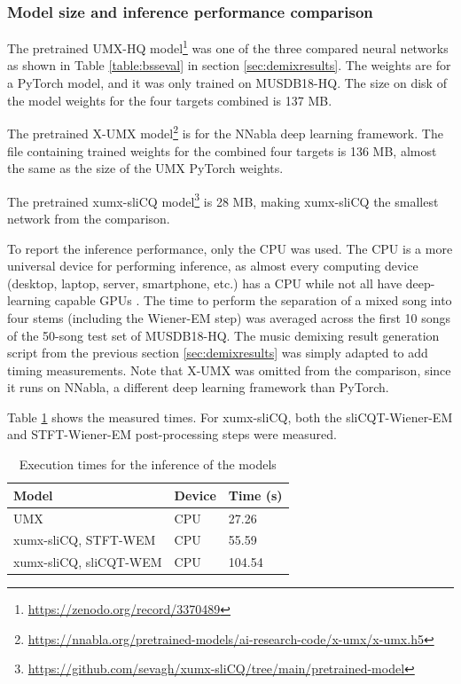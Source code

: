 \documentclass[report.tex]{subfiles}
\begin{document}
\newpagefill

\subsubsection{Model size and inference performance comparison}
\label{sec:inferenceperf}

The pretrained UMX-HQ model\footnote{\url{https://zenodo.org/record/3370489}} was one of the three compared neural networks as shown in Table \ref{table:bsseval} in section \ref{sec:demixresults}. The weights are for a PyTorch model, and it was only trained on MUSDB18-HQ. The size on disk of the model weights for the four targets combined is 137 MB.

The pretrained X-UMX model\footnote{\url{https://nnabla.org/pretrained-models/ai-research-code/x-umx/x-umx.h5}} is for the NNabla deep learning framework. The file containing trained weights for the combined four targets is 136 MB, almost the same as the size of the UMX PyTorch weights.

The pretrained xumx-sliCQ model\footnote{\url{https://github.com/sevagh/xumx-sliCQ/tree/main/pretrained-model}} is 28 MB, making xumx-sliCQ the smallest network from the comparison.

To report the inference performance, only the CPU was used. The CPU is a more universal device for performing inference, as almost every computing device (desktop, laptop, server, smartphone, etc.) has a CPU while not all have deep-learning capable GPUs \parencite{deepcpuinf, deepcpuinf2}. The time to perform the separation of a mixed song into four stems (including the Wiener-EM step) was averaged across the first 10 songs of the 50-song test set of MUSDB18-HQ. The music demixing result generation script from the previous section \ref{sec:demixresults} was simply adapted to add timing measurements. Note that X-UMX was omitted from the comparison, since it runs on NNabla, a different deep learning framework than PyTorch.

Table \ref{table:infperf} shows the measured times. For xumx-sliCQ, both the sliCQT-Wiener-EM and STFT-Wiener-EM post-processing steps were measured.

\begin{table}[ht]
	\centering
	\caption{Execution times for the inference of the models}
	\label{table:infperf}
	\begin{tabular}{ |l|l|l| }
	 \hline
		Model & Device & Time (s) \\
	 \hline
	 \hline
		UMX & CPU & 27.26  \\
	 \hline
		xumx-sliCQ, STFT-WEM & CPU & 55.59  \\
	 \hline
		xumx-sliCQ, sliCQT-WEM & CPU & 104.54  \\
	 \hline
\end{tabular}
\end{table}
\end{document}

